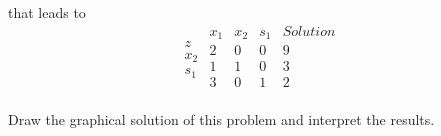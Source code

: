     that leads to
    \begin{equation*}
      \begin{array}{c}
        \\
        z\\
        x_2\\
        s_1\\
      \end{array}
      \begin{array}{ccc|c}
        x_1 & x_2 & s_1 &  Solution \\ \hline
        2 & 0 & 0 &  9 \\ \hline
        1 & 1 & 0 & 3  \\
        3 & 0 & 1  & 2 \\
      \end{array}
    \end{equation*}

      Draw the graphical solution of this problem and interpret the results.

